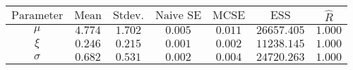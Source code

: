 \begin{tabular}{ccccccc}
\toprule
$\textrm{Parameter}$ & $\textrm{Mean}$ & $\textrm{Stdev.}$ & $\textrm{Naive SE}$ & $\textrm{MCSE}$ & $\textrm{ESS}$ & $\hat{R}$\\
\midrule
$\mu$ & $4.774$ & $1.702$ & $0.005$ & $0.011$ & $26657.405$ & $1.000$\\
$\xi$ & $0.246$ & $0.215$ & $0.001$ & $0.002$ & $11238.145$ & $1.000$\\
$\sigma$ & $0.682$ & $0.531$ & $0.002$ & $0.004$ & $24720.263$ & $1.000$\\
\bottomrule
\end{tabular}

